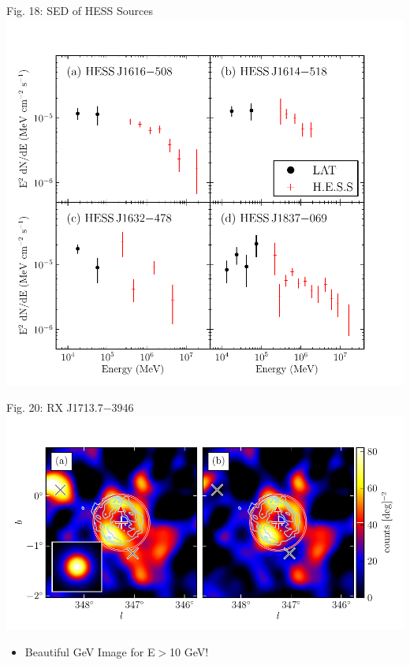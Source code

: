\documentclass[12pt]{beamer}
\begin{document}
\begin{frame}{Fig. 18: SED of HESS Sources}
  \includegraphics[scale=0.5]{plots/hess_seds_color.pdf}
\end{frame}

\begin{frame}{Fig. 20: RX J1713.7$-$3946}
  \includegraphics[scale=0.65]{plots/source_RX_J1713_7-3946_color.pdf}
  \begin{itemize}
  \item Beautiful GeV Image for E$>$10 GeV!
  \end{itemize}
\end{frame}
\end{document}
